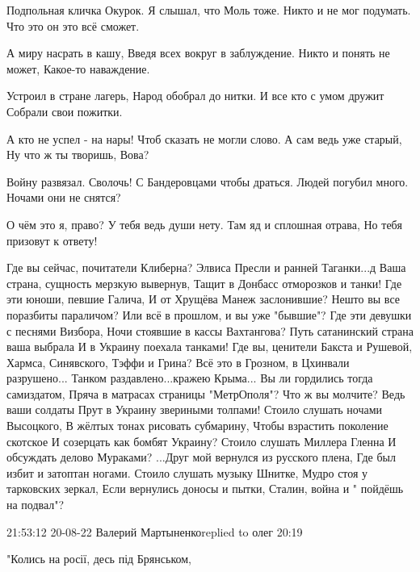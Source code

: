  
 
 
 
 

Подпольная кличка Окурок.
Я слышал, что Моль тоже.
Никто и не мог подумать.
Что это он это всё сможет.

А миру насрать в кашу,
Введя всех вокруг в заблуждение.
Никто и понять не может,
Какое-то наваждение.

Устроил в стране лагерь,
Народ обобрал до нитки.
И все кто с умом дружит
Собрали свои пожитки.

А кто не успел - на нары!
Чтоб сказать не могли слово.
А сам ведь уже старый,
Ну что ж ты творишь, Вова?

Войну развязал. Сволочь!
С Бандеровцами чтобы драться.
Людей погубил много.
Ночами они не снятся?

О  чём это я, право?
У тебя ведь души нету.
Там яд и сплошная отрава,
Но тебя призовут к ответу!



Где вы сейчас, почитатели Клиберна?
Элвиса Пресли и ранней Таганки...д
Ваша страна, сущность мерзкую вывернув,
Тащит в Донбасс отморозков и танки!
Где эти юноши, певшие Галича,
И от Хрущёва Манеж заслонившие?
Нешто вы все поразбиты параличом?
Или всё в прошлом, и вы уже "бывшие"?
Где эти девушки с песнями Визбора,
Ночи стоявшие в кассы Вахтангова?
Путь сатанинский страна ваша выбрала
И в Украину поехала танками!
Где вы, ценители Бакста и Рушевой,
Хармса, Синявского, Тэффи и Грина?
Всё это в Грозном, в Цхинвали разрушено...
Танком раздавлено...кражею Крыма...
Вы ли гордились тогда самиздатом,
Пряча в матрасах страницы "МетрОполя"?
Что ж вы молчите? Ведь ваши солдаты
Прут в Украину звериными толпами!
Стоило слушать ночами Высоцкого,
В жёлтых тонах рисовать субмарину,
Чтобы взрастить поколение скотское
И созерцать как бомбят Украину?
Стоило слушать Миллера Гленна
И обсуждать делово Мураками?
...Друг мой вернулся из русского плена,
Где был избит и затоптан ногами.
Стоило слушать музыку Шнитке,
Мудро стоя у тарковских зеркал,
Если вернулись доносы и пытки,
Сталин, война и " пойдёшь на подвал"?


21:53:12 20-08-22
Валерий Мартыненкоreplied to олег
20:19

"Колись на росії, десь під Брянськом,


